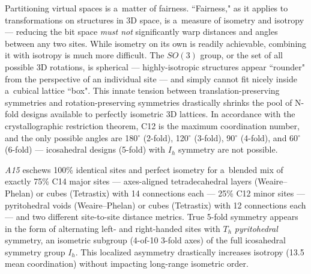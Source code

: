 \documentclass[10pt]{article}
\def\AAAB{\textit{A15}}
\def\TS{Tetrastix} \def\TSP{Tetrastix~Prism} \def\TTSp{The~Tetrastix~prism} \def\tTSp{the~Tetrastix~prism}
\def\WP{Weaire--Phelan} \def\WPH{Weaire--Phelan~Honeycomb} \def\TWPh{The~Weaire--Phelan~honeycomb}
\begin{document}
Partitioning virtual spaces is a~matter of fairness. ``Fairness," as it applies to transformations on structures in 3D space, is
a~measure of isometry and isotropy --- reducing the bit space \emph{must not} significantly warp distances and angles between any
two sites. While isometry on its own is readily achievable, combining it with isotropy is much more difficult. The $SO(3)$ group,
or the set of all possible 3D rotations, is spherical --- highly-isotropic structures appear ``rounder" from the perspective of an
individual site --- and simply cannot fit nicely inside a~cubical lattice ``box". This innate tension between
translation-preserving symmetries and rotation-preserving symmetries drastically shrinks the pool of N-fold designs available to
perfectly isometric 3D lattices. In accordance with the crystallographic restriction theorem, C12 is the maximum coordination
number, and the only possible angles are 180$^{\circ}$ (2-fold), 120$^{\circ}$ (3-fold), 90$^{\circ}$ (4-fold), and 60$^{\circ}$
(6-fold) --- icosahedral designs (5-fold) with $I_h$ symmetry are not possible.

\AAAB{} eschews 100\% identical sites and perfect isometry for a~blended mix of exactly 75\% C14 major
sites --- axes-aligned tetradecahedral layers (\WP) or cubes (\TS) with 14 connections each --- 25\% C12 minor sites --- pyritohedral
voids (\WP) or cubes (\TS) with 12 connections each --- and two different site-to-site distance metrics. True 5-fold symmetry
appears in the form of alternating left- and right-handed sites with $T_h$ \emph{pyritohedral} symmetry, an isometric subgroup
(4-of-10 3-fold axes) of the full icosahedral symmetry group $I_h$. This localized asymmetry drastically increases isotropy (13.5
mean coordination) without impacting long-range isometric order.
\end{document}
